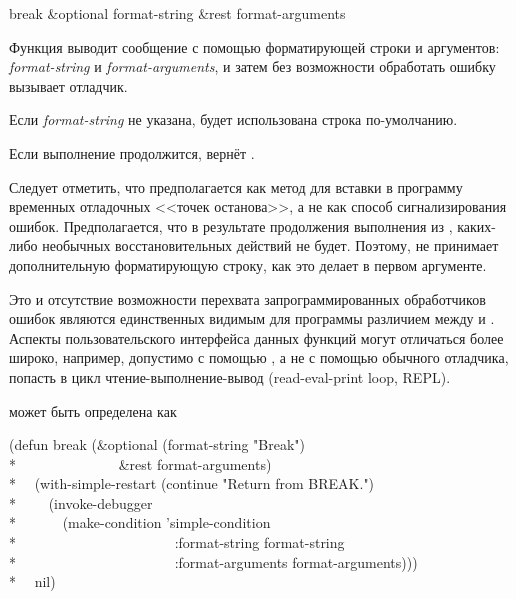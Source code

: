 \begin{defun}[Функция]
break &optional format-string &rest format-arguments

Функция  выводит сообщение с помощью форматирующей строки и
аргументов: \emph{format-string} и \emph{format-arguments}, и затем без
возможности обработать ошибку вызывает отладчик.

Если \emph{format-string} не указана, будет использована строка по-умолчанию.

Если выполнение продолжится,  вернёт .

Следует отметить, что  предполагается как метод для вставки в
программу временных отладочных <<точек останова>>, а не как способ
сигнализирования ошибок. Предполагается, что в результате продолжения выполнения
из , каких-либо необычных восстановительных действий не
будет. Поэтому,  не принимает дополнительную форматирующую строку,
как это делает  в первом аргументе.

Это и отсутствие возможности перехвата запрограммированных обработчиков ошибок
являются единственных видимым для программы различием между  и
. Аспекты пользовательского интерфейса данных функций могут
отличаться более широко, например, допустимо с помощью , а не с
помощью обычного отладчика, попасть в цикл чтение-выполнение-вывод
(read-eval-print loop, REPL).

 может быть определена как
\begin{lisp}
(defun break (\&optional (format-string "Break") \\*
~~~~~~~~~~~~~~\&rest format-arguments) \\*
~~(with-simple-restart (continue "Return from BREAK.") \\*
~~~~(invoke-debugger \\*
~~~~~~(make-condition 'simple-condition \\*
~~~~~~~~~~~~~~~~~~~~~~:format-string format-string \\*
~~~~~~~~~~~~~~~~~~~~~~:format-arguments format-arguments))) \\*
~~nil)
\end{lisp}
\end{defun}

